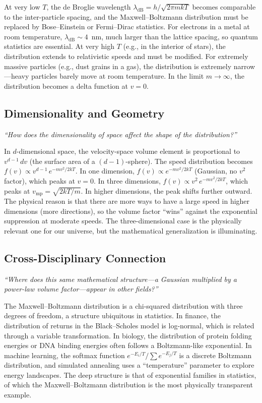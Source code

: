 At very low $T$, the de Broglie wavelength $\lambda_{\text{dB}} = h/\sqrt{2\pi mkT}$ becomes comparable to the inter-particle spacing, and the Maxwell--Boltzmann distribution must be replaced by Bose--Einstein or Fermi--Dirac statistics. For electrons in a metal at room temperature, $\lambda_{\text{dB}} \sim 4$~nm, much larger than the lattice spacing, so quantum statistics are essential. At very high $T$ (e.g., in the interior of stars), the distribution extends to relativistic speeds and must be modified. For extremely massive particles (e.g., dust grains in a gas), the distribution is extremely narrow---heavy particles barely move at room temperature. In the limit $m \to \infty$, the distribution becomes a delta function at $v = 0$.

\subsection*{Dimensionality and Geometry}
\textit{``How does the dimensionality of space affect the shape of the distribution?''}

In $d$-dimensional space, the velocity-space volume element is proportional to $v^{d-1}\,dv$ (the surface area of a $(d-1)$-sphere). The speed distribution becomes $f(v) \propto v^{d-1}\,e^{-mv^{2}/2kT}$. In one dimension, $f(v) \propto e^{-mv^{2}/2kT}$ (Gaussian, no $v^{2}$ factor), which peaks at $v = 0$. In three dimensions, $f(v) \propto v^{2}\,e^{-mv^{2}/2kT}$, which peaks at $v_{\text{mp}} = \sqrt{2kT/m}$. In higher dimensions, the peak shifts further outward. The physical reason is that there are more ways to have a large speed in higher dimensions (more directions), so the volume factor ``wins'' against the exponential suppression at moderate speeds. The three-dimensional case is the physically relevant one for our universe, but the mathematical generalization is illuminating.

\subsection*{Cross-Disciplinary Connection}
\textit{``Where does this same mathematical structure---a Gaussian multiplied by a power-law volume factor---appear in other fields?''}

The Maxwell--Boltzmann distribution is a chi-squared distribution with three degrees of freedom, a structure ubiquitous in statistics. In finance, the distribution of returns in the Black--Scholes model is log-normal, which is related through a variable transformation. In biology, the distribution of protein folding energies or DNA binding energies often follows a Boltzmann-like exponential. In machine learning, the softmax function $e^{-E_{i}/T}/\sum e^{-E_{j}/T}$ is a discrete Boltzmann distribution, and simulated annealing uses a ``temperature'' parameter to explore energy landscapes. The deep structure is that of exponential families in statistics, of which the Maxwell--Boltzmann distribution is the most physically transparent example.


